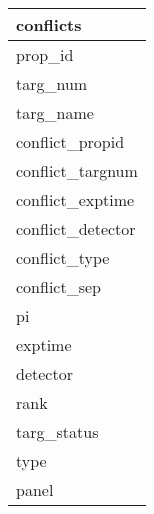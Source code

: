 \documentclass{article}
\begin{document}

\begin{tabular}{|l|} \hline
\textbf{conflicts} \\ \hline
prop\_id \\ \hline
targ\_num \\ \hline
targ\_name \\ \hline
conflict\_propid \\ \hline
conflict\_targnum \\ \hline
conflict\_exptime \\ \hline
conflict\_detector \\ \hline
conflict\_type \\ \hline
conflict\_sep \\ \hline
pi \\ \hline
exptime \\ \hline
detector \\ \hline
rank \\ \hline
targ\_status \\ \hline
type \\ \hline
panel \\ \hline
\end{tabular}
\end{document}
